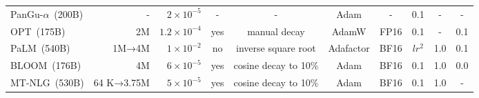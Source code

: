 {\begin{table}[htb]
{\begin{tabular}{lrrccccccc}
PanGu-$\alpha$~(200B)   & -                                                                                 & $2 \times 10^{-5}$                                                          & -               & -                       & Adam                                            & -                                                                          & 0.1                                                                                     & -                                                                     & -                \\
OPT~(175B)              & 2M                                                                                & $1.2 \times 10^{-4}$                                                        & yes             & manual decay            & AdamW                                           & FP16                                                                       & 0.1                                                                                     & -                                                                     & 0.1              \\
PaLM~(540B)             & 1M→4M                                                                             & $1 \times 10^{-2}$                                                          & no              & inverse square root     & Adafactor                                       & BF16                                                                       & $lr^2$                                                                                  & 1.0                                                                   & 0.1              \\
BLOOM~(176B)            & 4M                                                                                & $6 \times 10^{-5}$                                                          & yes             & cosine decay to 10\%    & Adam                                            & BF16                                                                       & 0.1                                                                                     & 1.0                                                                   & 0.0              \\
MT-NLG~(530B)           & 64 K→3.75M                                                                        & $5 \times 10^{-5}$                                                          & yes             & cosine decay to 10\%    & Adam                                            & BF16                                                                       & 0.1                                                                                     & 1.0                                                                   & -                \\

\end{tabular}}
\end{table}}
